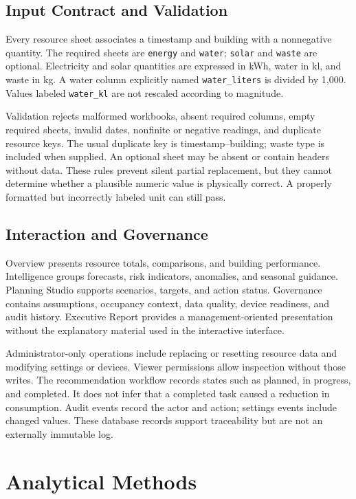 \documentclass[conference]{IEEEtran}
\begin{document}
\subsection{Input Contract and Validation}
Every resource sheet associates a timestamp and building with a nonnegative quantity. The required sheets are \texttt{energy} and \texttt{water}; \texttt{solar} and \texttt{waste} are optional. Electricity and solar quantities are expressed in kWh, water in kl, and waste in kg. A water column explicitly named \texttt{water\_liters} is divided by 1,000. Values labeled \texttt{water\_kl} are not rescaled according to magnitude.

Validation rejects malformed workbooks, absent required columns, empty required sheets, invalid dates, nonfinite or negative readings, and duplicate resource keys. The usual duplicate key is timestamp--building; waste type is included when supplied. An optional sheet may be absent or contain headers without data. These rules prevent silent partial replacement, but they cannot determine whether a plausible numeric value is physically correct. A properly formatted but incorrectly labeled unit can still pass.

\subsection{Interaction and Governance}
Overview presents resource totals, comparisons, and building performance. Intelligence groups forecasts, risk indicators, anomalies, and seasonal guidance. Planning Studio supports scenarios, targets, and action status. Governance contains assumptions, occupancy context, data quality, device readiness, and audit history. Executive Report provides a management-oriented presentation without the explanatory material used in the interactive interface.

Administrator-only operations include replacing or resetting resource data and modifying settings or devices. Viewer permissions allow inspection without those writes. The recommendation workflow records states such as planned, in progress, and completed. It does not infer that a completed task caused a reduction in consumption. Audit events record the actor and action; settings events include changed values. These database records support traceability but are not an externally immutable log.

\section{Analytical Methods}
\end{document}
